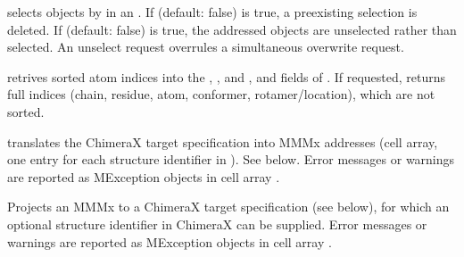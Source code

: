 \documentclass[letterpaper,10pt,english]{sphinxmanual}
\begin{document}
selects objects by  in an . If  (default: false) is true, a pre\sphinxhyphen{}existing selection is deleted.
If  (default: false) is true, the addressed objects are unselected rather than selected. An unselect request overrules a simultaneous overwrite request.

\begin{sphinxVerbatim}[commandchars=\\\{\}]
\PYG{p}{[}\PYG{p}{]}  
\end{sphinxVerbatim}

retrives sorted atom indices into the , , and , and  fields of .
If requested,  returns full indices (chain, residue, atom, conformer, rotamer/location), which are not sorted.

\begin{sphinxVerbatim}[commandchars=\\\{\}]
\PYG{p}{[}\PYG{p}{]}  
\end{sphinxVerbatim}

translates the ChimeraX target specification  into MMMx addresses (cell array, one entry for each structure identifier in ). See below.
Error messages or warnings are reported as MException objects in cell array .

\begin{sphinxVerbatim}[commandchars=\\\{\}]
\PYG{p}{[}\PYG{p}{]}  
\end{sphinxVerbatim}

Projects an MMMx  to a ChimeraX target specification  (see below), for which an optional structure identifier  in ChimeraX can be supplied.
Error messages or warnings are reported as MException objects in cell array .
\end{document}
